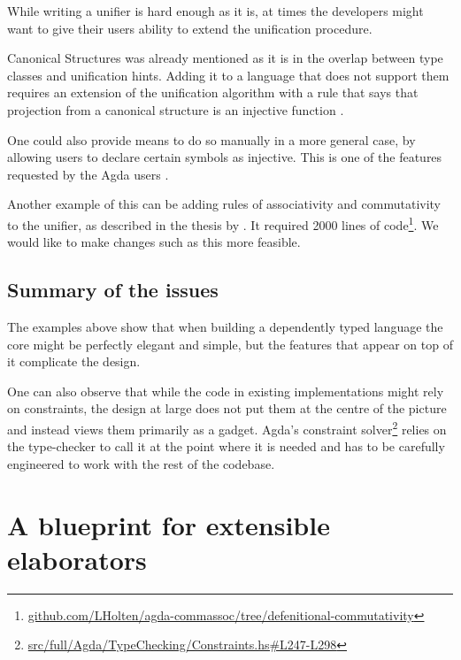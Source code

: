 \documentclass[
  sigconf,
  screen,
  review]{acmart}
\begin{document}
While writing a unifier is hard enough as it is, at times the developers
might want to give their users ability to extend the unification
procedure.

Canonical Structures
\citep{saibiOutilsGeneriquesModelisation1999, mahboubiCanonicalStructuresWorking2013}
was already mentioned as it is in the overlap between type classes and
unification hints. Adding it to a language that does not support them
requires an extension of the unification algorithm with a rule that says
that projection from a canonical structure is an injective function
\citep[eq. 1]{mahboubiCanonicalStructuresWorking2013}.

One could also provide means to do so manually in a more general case,
by allowing users to declare certain symbols as injective. This is one
of the features requested by the Agda users
\citep{agdausersInjectiveUnificationPragma2023}.

Another example of this can be adding rules of associativity and
commutativity to the unifier, as described in the thesis by
\citet{holtenDependentTypeCheckingModulo2023}. It required 2000 lines of
code\footnote{\href{https://github.com/LHolten/agda-commassoc/tree/defenitional-commutativity}{github.com/LHolten/agda-commassoc/tree/defenitional-commutativity}}.
We would like to make changes such as this more feasible.

\hypertarget{sec:summary-of-the-issues}{%
\subsection{Summary of the issues}\label{sec:summary-of-the-issues}}

The examples above show that when building a dependently typed language
the core might be perfectly elegant and simple, but the features that
appear on top of it complicate the design.

One can also observe that while the code in existing implementations
might rely on constraints, the design at large does not put them at the
centre of the picture and instead views them primarily as a gadget.
Agda's constraint solver\footnote{\href{https://github.com/agda/agda/blob/v2.6.4/src/full/Agda/TypeChecking/Constraints.hs\#L247-L298}{src/full/Agda/TypeChecking/Constraints.hs\#L247-L298}}
relies on the type-checker to call it at the point where it is needed
and has to be carefully engineered to work with the rest of the
codebase.

\hypertarget{sec:what-is-our-design-bringing-into-the-picture}{%
\section{A blueprint for extensible
elaborators}\label{sec:what-is-our-design-bringing-into-the-picture}}
\end{document}
